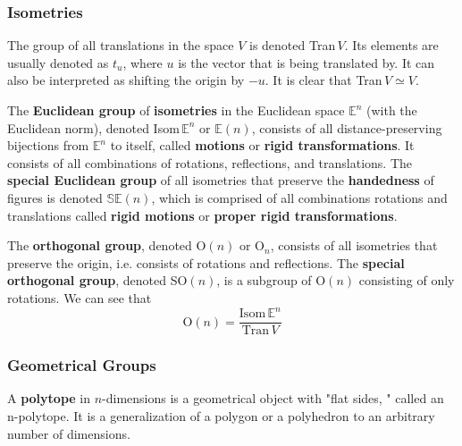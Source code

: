 \documentclass{article}
\begin{document}
    \subsubsection{Isometries}

      \begin{definition}
        The group of all translations in the space $V$ is denoted Tran$\,V$. Its elements are usually denoted as $t_{u}$, where $u$ is the vector that is being translated by. It can also be interpreted as shifting the origin by $-u$. It is clear that Tran$\,V \simeq V$. 
      \end{definition}

      \begin{definition}
        The \textbf{Euclidean group} of \textbf{isometries} in the Euclidean space $\mathbb{E}^{n}$ (with the Euclidean norm), denoted Isom$\, \mathbb{E}^{n}$ or $\mathbb{E}(n)$, consists of all distance-preserving bijections from $\mathbb{E}^{n}$ to itself, called \textbf{motions} or \textbf{rigid transformations}. It consists of all combinations of rotations, reflections, and translations. The \textbf{special Euclidean group} of all isometries that preserve the \textbf{handedness} of figures is denoted $\mathbb{SE}(n)$, which is comprised of all combinations rotations and translations called \textbf{rigid motions} or \textbf{proper rigid transformations}.
      \end{definition}

      \begin{definition}
        The \textbf{orthogonal group}, denoted O$(n)$ or O$_{n}$, consists of all isometries that preserve the origin, i.e. consists of rotations and reflections. The \textbf{special orthogonal group}, denoted SO$(n)$, is a subgroup of O$(n)$ consisting of only rotations. We can see that 
        \begin{equation}
          \text{O}(n)=\frac{\text{Isom}\, \mathbb{E}^{n}}{\text{Tran}\,V}
        \end{equation}
      \end{definition}

    \subsubsection{Geometrical Groups}

      \begin{definition}
        A \textbf{polytope} in $n$-dimensions is a geometrical object with "flat sides, " called an n-polytope. It is a generalization of a polygon or a polyhedron to an arbitrary number of dimensions. 
      \end{definition}
\end{document}
